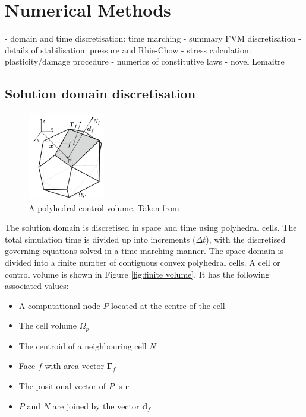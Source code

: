 \documentclass[sn-mathphys,Numbered,draft]{sn-jnl}%
\begin{document}
\section{Numerical Methods}\label{sec:numerical_methods}

- domain and time discretisation: time marching
- summary FVM discretisation
- details of stabilisation: pressure and Rhie-Chow
- stress calculation: plasticity/damage procedure
- numerics of constitutive laws
- novel Lemaitre

\subsection{Solution domain discretisation}

\begin{figure}[htb]
\begin{center}
	\includegraphics[width=0.3\textwidth]{./figures/controlVolume.png}
\caption{A polyhedral control volume. Taken from \cite{cardiff2016}}
\label{fig:finite_volume}
\end{center}
\end{figure}
The solution domain is discretised in space and time using polyhedral cells. The total simulation time is divided up into increments ($\Delta t$), with the discretised governing equations solved in a time-marching manner. The space domain is divided into a finite number of contiguous convex polyhedral cells. A cell or control volume is shown in Figure \ref{fig:finite volume}. It has the following associated values:
\begin{itemize}
	\item A computational node $P$ located at the centre of the cell
	\item The cell volume $\Omega_{p}$
	\item The centroid of a neighbouring cell $N$
	\item Face $f$ with area vector $\mathbf{\Gamma}_f$
    \item The positional vector of $P$ is $\textbf{r}$
    \item $P$ and $N$ are joined by the vector $\mathbf{d}_{f}$
\end{itemize}
\end{document}
